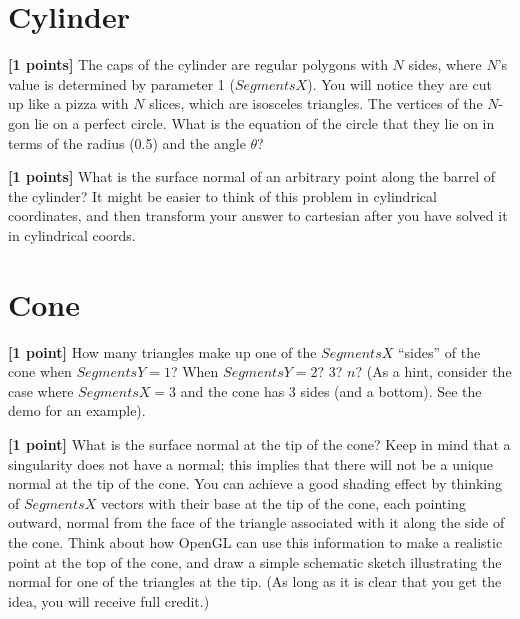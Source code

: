 \documentclass[10pt,twocolumn]{article}
\begin{document}
\section{Cylinder}
{\bf [1 points]} The caps of the cylinder are regular polygons with $N$ sides, where $N$'s value is determined by parameter 1 ($SegmentsX$). You will notice they are cut up like a pizza with $N$ slices, which are isosceles triangles. The vertices of the $N$-gon lie on a perfect circle. What is the equation of the circle that they lie on  in terms of the radius (0.5) and the angle $\theta$?
\begin{framed}
\vspace{6em}
\end{framed}

{\bf [1 points]} What is the surface normal of an arbitrary point along the barrel of the cylinder? It might be easier to think of this problem in cylindrical coordinates, and then transform your answer to cartesian after you have solved it in cylindrical coords.
\begin{framed}
\vspace{6em}
\end{framed}


\section{Cone}
{\bf [1 point]} How many triangles make up one of the $SegmentsX$ ``sides'' of the cone when $SegmentsY=1$? When $SegmentsY=2$? 3? $n$? (As a hint, consider the case where $SegmentsX=3$ and the cone has 3 sides (and a bottom). See the demo for an example).
\begin{framed}
\vspace{10em}
\end{framed}

{\bf [1 point]} What is the surface normal at the tip of the cone? Keep in mind that a singularity does not have a normal; this implies that there will not be a unique normal at the tip of the cone. You can achieve a good shading effect by thinking of $SegmentsX$ vectors with their base at the tip of the cone, each pointing outward, normal from the face of the triangle associated with it along the side of the cone. Think about how OpenGL can use this information to make a realistic point at the top of the cone, and draw a simple schematic sketch illustrating the normal for one of the triangles at the tip. (As long as it is clear that you get the idea, you will receive full credit.)
\begin{framed}
\vspace{8em}
\end{framed}
\end{document}
